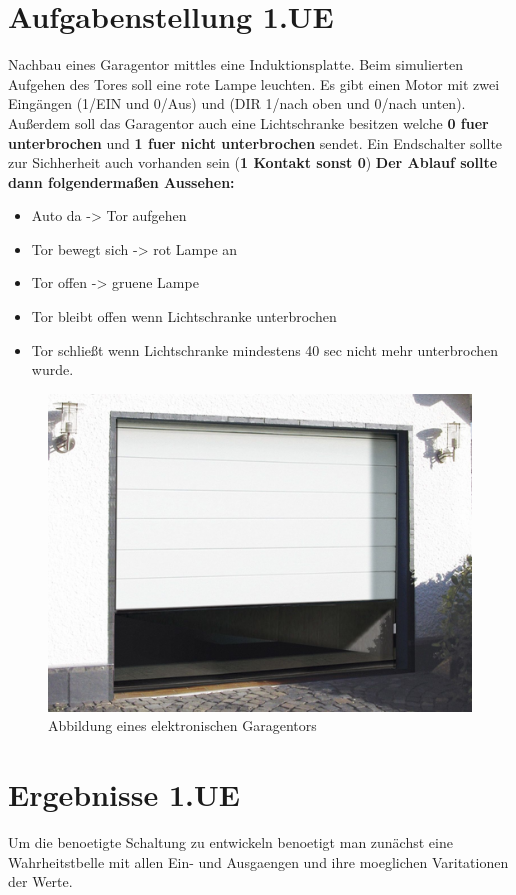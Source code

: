 
\section{Aufgabenstellung 1.UE}
Nachbau eines Garagentor mittles eine Induktionsplatte. Beim simulierten Aufgehen des Tores soll eine rote Lampe leuchten. Es gibt einen Motor mit zwei Eingängen (1/EIN und 0/Aus) und (DIR 1/nach oben und 0/nach unten). Außerdem soll das Garagentor auch eine Lichtschranke besitzen welche \textbf{0 fuer unterbrochen} und \textbf{1 fuer nicht unterbrochen} sendet. Ein Endschalter sollte zur Sichherheit auch vorhanden sein (\textbf{1 Kontakt sonst 0})
\textbf{Der Ablauf sollte dann folgendermaßen Aussehen:}
\begin{itemize}
	\item Auto da -> Tor aufgehen
	\item Tor bewegt sich -> rot Lampe an
	\item Tor offen -> gruene Lampe
	\item Tor bleibt offen wenn Lichtschranke unterbrochen
	\item Tor schließt wenn Lichtschranke mindestens 40 sec nicht mehr unterbrochen wurde.
\end{itemize}

\begin{figure}[!h]
	\begin{center}
		\includegraphics[width=0.5\linewidth]{images/garagentor}
		\caption{Abbildung eines elektronischen Garagentors}
		\label{garage}
	\end{center}
\end{figure}
\newpage

\section{Ergebnisse 1.UE}
Um die benoetigte Schaltung zu entwickeln benoetigt man zunächst eine Wahrheitstbelle mit allen Ein- und Ausgaengen und ihre moeglichen Varitationen der Werte. 


